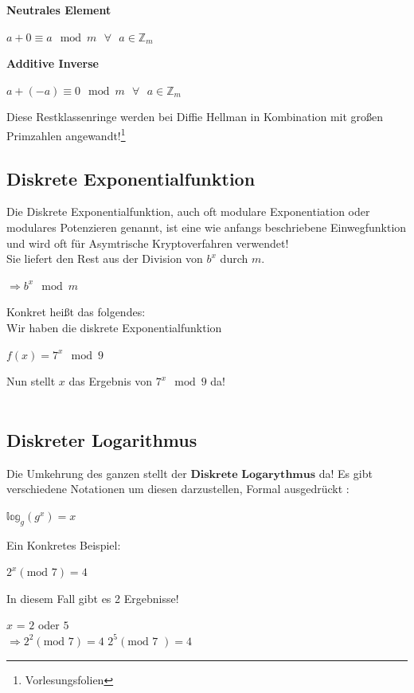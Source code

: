 \documentclass[a4paper,12pt]{scrartcl}
\begin{document}
\textbf{Neutrales Element}
\begin{center}
$a + 0 \equiv a \mod m \text{  } \forall \text{  } a \in \mathbb{Z}_{m}$
\end{center}
\textbf{Additive Inverse}
\begin{center}
$a + (-a) \equiv 0 \mod m \text{  }  \forall \text{  } a \in \mathbb{Z}_{m}$
\end{center}



Diese Restklassenringe werden bei Diffie Hellman in Kombination mit großen Primzahlen angewandt!\footnote{Vorlesungsfolien}

\newpage
\subsection{ Diskrete Exponentialfunktion }

Die Diskrete Exponentialfunktion, auch oft modulare Exponentiation oder modulares Potenzieren genannt, ist eine wie anfangs beschriebene Einwegfunktion und wird oft für Asymtrische Kryptoverfahren verwendet!\\
Sie liefert den Rest aus der Division von $b^{x}$ durch $m$.

\begin{center}
$\Rightarrow b^{x} \mod m $
\end{center}

Konkret heißt das folgendes:\\
Wir haben die diskrete Exponentialfunktion 
\begin{center}
 $f(x) = 7^x \mod 9$
\end{center}
Nun stellt $x$ das Ergebnis von $7^x \mod 9$ da! \\
\\
\subsection{Diskreter Logarithmus}
Die Umkehrung des ganzen stellt der $\textbf{Diskrete Logarythmus}$ da! Es gibt verschiedene Notationen um diesen darzustellen, Formal ausgedrückt :\\

\begin{center}
$\mathbb{\text{log}}_{g}(g^x)=x$

\end{center}

Ein Konkretes Beispiel:
\begin{center}
 $2^x (\text{mod 7} ) = 4$
\end{center}
In diesem Fall gibt es 2 Ergebnisse!
\begin{center}
 $x$ = $2$ oder $5$\\
 $\Rightarrow 2^2 (\text{mod 7}) = 4$ \text{       } $2^5 (\text{mod 7 }) = 4$
\end{center}
\end{document}
